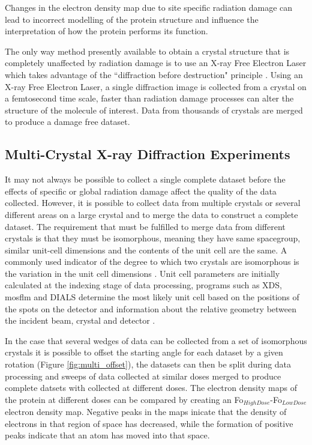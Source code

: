 Changes in the electron density map due to site specific radiation damage can lead to incorrect modelling of the protein structure and influence the interpretation of how the protein performs its function.%

The only way method presently available to obtain a crystal structure that is completely unaffected by radiation damage is to use an X-ray Free Electron Laser which takes advantage of the ``diffraction before destruction" principle \cite{Chapman2014}. Using an X-ray Free Electron Laser, a single diffraction image is collected from a crystal on a femtosecond time scale, faster than radiation damage processes can alter the structure of the molecule of interest. Data from thousands of crystals are merged to produce a damage free dataset.               
\newpage
\subsection{Multi-Crystal X-ray Diffraction Experiments}
\label{sec:multixtal_intro}

It may not always be possible to collect a single complete dataset before the effects of specific or global radiation damage affect the quality of the data collected. However, it is possible to collect data from multiple crystals or several different areas on a large crystal and to merge the data to construct a complete dataset. The requirement that must be fulfilled to merge data from different crystals is that they must be isomorphous, meaning they have same spacegroup, similar unit-cell dimensions and the contents of the unit cell are the same. A commonly used indicator of the degree to which two crystals are isomorphous is the variation in the unit cell dimensions \cite{Foadi2013}. Unit cell parameters are initially calculated at the indexing stage of data processing, programs such as XDS, mosflm and DIALS determine the most likely unit cell based on the positions of the spots on the detector and information about the relative geometry between the incident beam, crystal and detector \cite{Kabsch2010,Waterman2016,Battye2011}. 

In the case that several wedges of data can be collected from a set of isomorphous crystals it is possible to offset the starting angle for each dataset by a given rotation (Figure \ref{fig:multi_offset}), the datasets can then be split during data processing and sweeps of data collected at similar doses merged to produce complete datsets with collected at different doses. The electron density maps of the protein at different doses can be compared by creating an Fo$_{HighDose}$-Fo$_{LowDose}$ electron density map. Negative peaks in the maps inicate that the density of electrons in that region of space has decreased, while the formation of positive peaks indicate that an atom has moved into that space.

